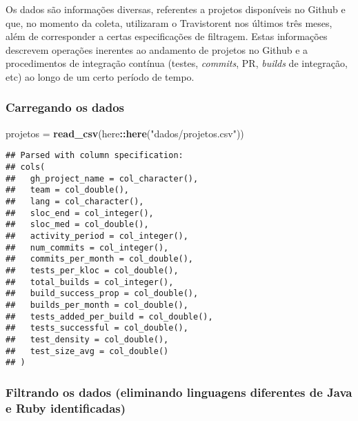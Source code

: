 \documentclass[]{article}
\newenvironment{Shaded}{\begin{snugshade}}{\end{snugshade}}
\newcommand{\KeywordTok}[1]{\textcolor[rgb]{0.13,0.29,0.53}{\textbf{#1}}}
\newcommand{\StringTok}[1]{\textcolor[rgb]{0.31,0.60,0.02}{#1}}
\newcommand{\OperatorTok}[1]{\textcolor[rgb]{0.81,0.36,0.00}{\textbf{#1}}}
\newcommand{\NormalTok}[1]{#1}
\begin{document}
Os dados são informações diversas, referentes a projetos disponíveis no
Github e que, no momento da coleta, utilizaram o Travistorent nos
últimos três meses, além de corresponder a certas especificações de
filtragem. Estas informações descrevem operações inerentes ao andamento
de projetos no Github e a procedimentos de integração contínua (testes,
\emph{commits}, PR, \emph{builds} de integração, etc) ao longo de um
certo período de tempo.

\subsubsection{Carregando os dados}\label{carregando-os-dados}

\begin{Shaded}
\begin{Highlighting}[]
\NormalTok{projetos =}\StringTok{ }\KeywordTok{read_csv}\NormalTok{(here}\OperatorTok{::}\KeywordTok{here}\NormalTok{(}\StringTok{"dados/projetos.csv"}\NormalTok{))}
\end{Highlighting}
\end{Shaded}

\begin{verbatim}
## Parsed with column specification:
## cols(
##   gh_project_name = col_character(),
##   team = col_double(),
##   lang = col_character(),
##   sloc_end = col_integer(),
##   sloc_med = col_double(),
##   activity_period = col_integer(),
##   num_commits = col_integer(),
##   commits_per_month = col_double(),
##   tests_per_kloc = col_double(),
##   total_builds = col_integer(),
##   build_success_prop = col_double(),
##   builds_per_month = col_double(),
##   tests_added_per_build = col_double(),
##   tests_successful = col_double(),
##   test_density = col_double(),
##   test_size_avg = col_double()
## )
\end{verbatim}

\subsubsection{Filtrando os dados (eliminando linguagens diferentes de
Java e Ruby
identificadas)}\label{filtrando-os-dados-eliminando-linguagens-diferentes-de-java-e-ruby-identificadas}

\begin{Shaded}
\end{Shaded}
\end{document}
